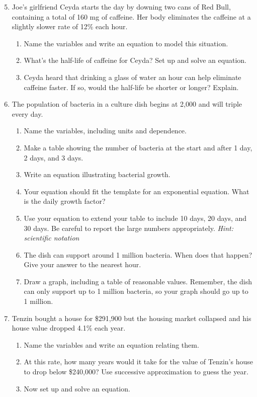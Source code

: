 \begin{enumerate} 
\setcounter{enumi}{4}
\item Joe's girlfriend Ceyda starts the day by downing two cans of Red Bull, containing a total of 160 mg of caffeine.  Her body eliminates the caffeine at a slightly slower rate of 12\% each hour.  
\begin{enumerate}
\item Name the variables and write an equation to model this situation.  
\item What's the half-life of caffeine for Ceyda?  Set up and solve an equation.
\item Ceyda heard that drinking a glass of water an hour can help eliminate caffeine faster.  If so, would the half-life be shorter or longer?  Explain.
\end{enumerate}

\item  The population of bacteria in a culture dish begins at 2,000 and will triple every day.  
\begin{enumerate}
\item Name the variables, including units and dependence.
\item Make a table showing the number of bacteria at the start and after 1 day, 2 days, and 3 days.
\item Write an equation illustrating bacterial growth.
\item Your equation should fit the template for an exponential equation. What is the daily growth factor?
\item Use your equation to extend your table to include 10 days, 20 days, and 30 days. Be careful to report the large numbers appropriately.  \emph{Hint: scientific notation}
\item The dish can support around 1 million bacteria.  When does that happen?  Give your answer to the nearest hour.
\item Draw a graph, including a table of reasonable values.  Remember, the dish can only support up to 1 million bacteria, so your graph should go up to 1 million.
\end{enumerate}

\item Tenzin bought a house for \$291,900 but the housing market collapsed and his house value dropped 4.1\% each year. 
 \begin{enumerate}
\item Name the variables and write an equation relating them.
\item At this rate, how many years would it take for the value of Tenzin's house to drop below \$240,000?  Use successive approximation to guess the year.
\item Now set up and solve an equation.
\end{enumerate}


\end{enumerate}
